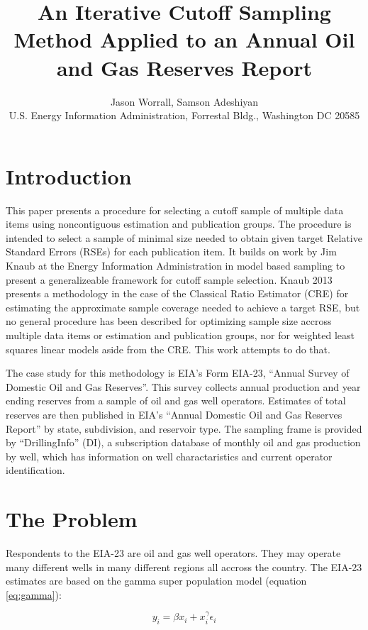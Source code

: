 \documentclass[11pt]{article} %
\title{An Iterative Cutoff Sampling Method Applied to an Annual Oil and Gas Reserves Report}
\author{Jason Worrall, Samson Adeshiyan\\
U.S. Energy Information Administration, Forrestal Bldg., Washington DC 20585}
\begin{document}
\maketitle

\section{Introduction}
This paper presents a procedure for selecting a cutoff sample of multiple data items using noncontiguous estimation and publication groups. The procedure is intended to select a sample of minimal size needed to obtain given target Relative Standard Errors (RSEs) for each publication item. It builds on work by Jim Knaub at the Energy Information Administration in model based sampling to present a generalizeable framework for cutoff sample selection.  Knaub 2013 \cite{Knaub2013} presents a methodology in the case of the Classical Ratio Estimator (CRE) for estimating the approximate sample coverage needed to achieve a target RSE, but no general procedure has been described for optimizing sample size accross multiple data items or estimation and publication groups, nor for weighted least squares linear models aside from the CRE. This work attempts to do that.
\par
The case study for this methodology is EIA's Form EIA-23, ``Annual Survey of Domestic Oil and Gas Reserves''. This survey collects annual production and year ending reserves from a sample of oil and gas well operators.  Estimates of total reserves are then published in EIA's ``Annual Domestic Oil and Gas Reserves Report'' by state, subdivision, and reservoir type. The sampling frame is provided by ``DrillingInfo'' (DI), a subscription database of monthly oil and gas production by well, which has information on well charactaristics and current operator identification.

\section{The Problem}
Respondents to the EIA-23 are oil and gas well operators. They may operate many different wells in many different regions all accross the country. The EIA-23 estimates are based on the gamma super population model (equation \ref{eq:gamma}):

\begin{equation} \label{eq:gamma}
y_i=\beta x_i + x_i^{\gamma}\epsilon_i
\end{equation}
\end{document}
